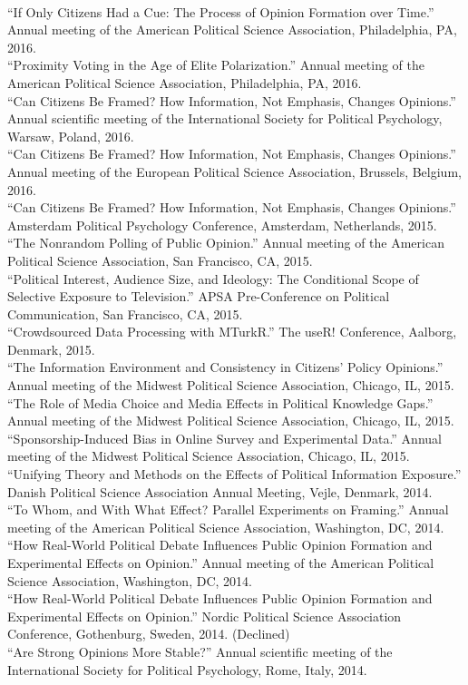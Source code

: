 \documentclass[12pt]{article}
\newcommand{\topic}[1]{\pagebreak[3]\indent {\color{lg}{\footnotesize #1 }}\\}
\newcommand{\entry}[1]{\indent {\color{lg}\guillemotright}\hspace{2pt}#1\vspace{.25em}\\}
\begin{document}
\topic{Conference Papers}
	\entry{``If Only Citizens Had a Cue: The Process of Opinion Formation over Time.'' Annual meeting of the American Political Science Association, Philadelphia, PA, 2016.}
	\entry{``Proximity Voting in the Age of Elite Polarization.'' Annual meeting of the American Political Science Association, Philadelphia, PA, 2016.}
	\entry{``Can Citizens Be Framed? How Information, Not Emphasis, Changes Opinions.'' Annual scientific meeting of the International Society for Political Psychology, Warsaw, Poland, 2016.}
	\entry{``Can Citizens Be Framed? How Information, Not Emphasis, Changes Opinions.'' Annual meeting of the European Political Science Association, Brussels, Belgium, 2016.}
	\entry{``Can Citizens Be Framed? How Information, Not Emphasis, Changes Opinions.'' Amsterdam Political Psychology Conference, Amsterdam, Netherlands, 2015.}
	\entry{``The Nonrandom Polling of Public Opinion.'' Annual meeting of the American Political Science Association, San Francisco, CA, 2015.}
	\entry{``Political Interest, Audience Size, and Ideology: The Conditional Scope of Selective Exposure to Television.'' APSA Pre-Conference on Political Communication, San Francisco, CA, 2015.}
	\entry{``Crowdsourced Data Processing with MTurkR.'' The useR! Conference, Aalborg, Denmark, 2015.}
	\entry{``The Information Environment and Consistency in Citizens' Policy Opinions.'' Annual meeting of the Midwest Political Science Association, Chicago, IL, 2015.}
	\entry{``The Role of Media Choice and Media Effects in Political Knowledge Gaps.'' Annual meeting of the Midwest Political Science Association, Chicago, IL, 2015.}
	\entry{``Sponsorship-Induced Bias in Online Survey and Experimental Data.'' Annual meeting of the Midwest Political Science Association, Chicago, IL, 2015.}
	\entry{``Unifying Theory and Methods on the Effects of Political Information Exposure.'' Danish Political Science Association Annual Meeting, Vejle, Denmark, 2014.}
	\entry{``To Whom, and With What Effect? Parallel Experiments on Framing.'' Annual meeting of the American Political Science Association, Washington, DC, 2014.}
	\entry{``How Real-World Political Debate Influences Public Opinion Formation and Experimental Effects on Opinion.'' Annual meeting of the American Political Science Association, Washington, DC, 2014.}
	\entry{``How Real-World Political Debate Influences Public Opinion Formation and Experimental Effects on Opinion.'' Nordic Political Science Association Conference, Gothenburg, Sweden, 2014. (Declined)}
	\entry{``Are Strong Opinions More Stable?'' Annual scientific meeting of the International Society for Political Psychology, Rome, Italy, 2014.}
\end{document}
